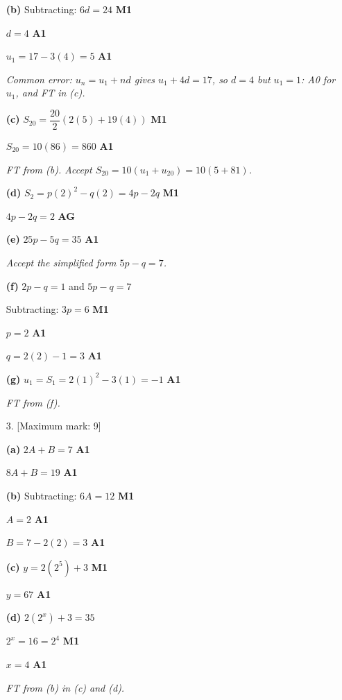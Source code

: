 \documentclass[12pt, twoside]{article}
\begin{document}
\begin{enumerate}[itemsep=0.3cm]
\textbf{(b)} Subtracting: $6d = 24$ \hfill \textbf{M1}

$d = 4$ \hfill \textbf{A1}

$u_{1} = 17 - 3(4) = 5$ \hfill \textbf{A1}

\emph{Common error: $u_{n} = u_{1} + nd$ gives $u_{1} + 4d = 17$, so
$d = 4$ but $u_{1} = 1$: A0 for $u_{1}$, and FT in (c).}

\textbf{(c)} $S_{20} = \dfrac{20}{2}\left(2(5) + 19(4)\right)$
\hfill \textbf{M1}

$S_{20} = 10(86) = 860$ \hfill \textbf{A1}

\emph{FT from (b). Accept $S_{20} = 10(u_{1} + u_{20}) = 10(5 + 81)$.}

\textbf{(d)} $S_{2} = p(2)^{2} - q(2) = 4p - 2q$ \hfill \textbf{M1}

$4p - 2q = 2$ \hfill \textbf{AG}

\textbf{(e)} $25p - 5q = 35$ \hfill \textbf{A1}

\emph{Accept the simplified form $5p - q = 7$.}

\textbf{(f)} $2p - q = 1$ and $5p - q = 7$

Subtracting: $3p = 6$ \hfill \textbf{M1}

$p = 2$ \hfill \textbf{A1}

$q = 2(2) - 1 = 3$ \hfill \textbf{A1}

\textbf{(g)} $u_{1} = S_{1} = 2(1)^{2} - 3(1) = -1$ \hfill \textbf{A1}

\emph{FT from (f).}

\newpage

\item[3.] [Maximum mark: 9]

\textbf{(a)} $2A + B = 7$ \hfill \textbf{A1}

$8A + B = 19$ \hfill \textbf{A1}

\textbf{(b)} Subtracting: $6A = 12$ \hfill \textbf{M1}

$A = 2$ \hfill \textbf{A1}

$B = 7 - 2(2) = 3$ \hfill \textbf{A1}

\textbf{(c)} $y = 2\left(2^{5}\right) + 3$ \hfill \textbf{M1}

$y = 67$ \hfill \textbf{A1}

\textbf{(d)} $2\left(2^{x}\right) + 3 = 35$

$2^{x} = 16 = 2^{4}$ \hfill \textbf{M1}

$x = 4$ \hfill \textbf{A1}

\emph{FT from (b) in (c) and (d).}


\end{enumerate}
\end{document}

